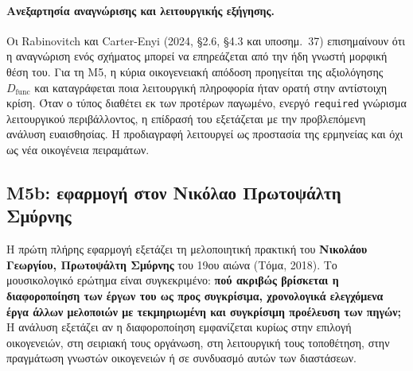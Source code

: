 \documentclass[11pt,a4paper]{article}
\begin{document}
\paragraph{Ανεξαρτησία αναγνώρισης και λειτουργικής εξήγησης.} Οι Rabinovitch και Carter-Enyi (2024, §2.6, §4.3 και υποσημ.~37) επισημαίνουν ότι η αναγνώριση ενός σχήματος μπορεί να επηρεάζεται από την ήδη γνωστή μορφική θέση του. Για τη M5, η κύρια οικογενειακή απόδοση προηγείται της αξιολόγησης $D_{\mathrm{func}}$ και καταγράφεται ποια λειτουργική πληροφορία ήταν ορατή στην αντίστοιχη κρίση. Όταν ο τύπος διαθέτει εκ των προτέρων παγωμένο, ενεργό \texttt{required} γνώρισμα λειτουργικού περιβάλλοντος, η επίδρασή του εξετάζεται με την προβλεπόμενη ανάλυση ευαισθησίας. Η προδιαγραφή λειτουργεί ως προστασία της ερμηνείας και όχι ως νέα οικογένεια πειραμάτων.

\subsection{M5b: εφαρμογή στον Νικόλαο Πρωτοψάλτη Σμύρνης}\label{sec:m5-nikolaos}

Η πρώτη πλήρης εφαρμογή εξετάζει τη μελοποιητική πρακτική του \textbf{Νικολάου Γεωργίου, Πρωτοψάλτη Σμύρνης} του 19ου αιώνα (Τόμα, 2018). Το μουσικολογικό ερώτημα είναι συγκεκριμένο: \textbf{πού ακριβώς βρίσκεται η διαφοροποίηση των έργων του ως προς συγκρίσιμα, χρονολογικά ελεγχόμενα έργα άλλων μελοποιών με τεκμηριωμένη και συγκρίσιμη προέλευση των πηγών;} Η ανάλυση εξετάζει αν η διαφοροποίηση εμφανίζεται κυρίως στην επιλογή οικογενειών, στη σειριακή τους οργάνωση, στη λειτουργική τους τοποθέτηση, στην πραγμάτωση γνωστών οικογενειών ή σε συνδυασμό αυτών των διαστάσεων.
\end{document}
